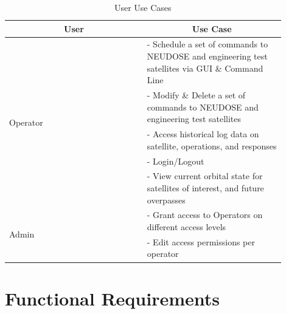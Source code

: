 \documentclass[12pt]{article}
\begin{document}
\begin{table}[H]
\centering
\caption{User Use Cases}
\begin{tabular}{|p{0.45\linewidth}|p{0.45\linewidth}|}
\hline
\multicolumn{1}{|c|}{User} & \multicolumn{1}{c|}{Use Case} \\
\hline
\multirow{5}{*}{Operator} & - Schedule a set of commands to NEUDOSE and engineering test satellites via GUI \& Command Line \\
& - Modify \& Delete a set of commands to NEUDOSE and engineering test satellites \\
& - Access historical log data on satellite, operations, and responses \\
& - Login/Logout \\
& - View current orbital state for satellites of interest, and future overpasses \\
\hline
\multirow{2}{*}{Admin} & - Grant access to Operators on different access levels \\
& - Edit access permissions per operator \\
\hline
\end{tabular}
\end{table}

\section{Functional Requirements}
\end{document}
